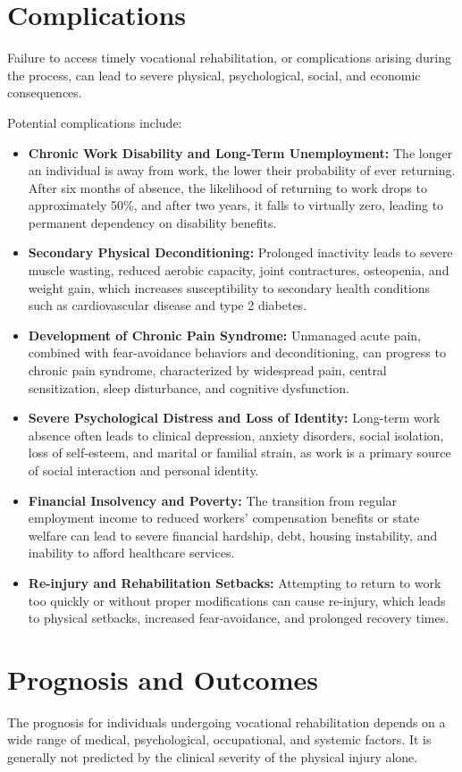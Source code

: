 \section*{Complications}
Failure to access timely vocational rehabilitation, or complications arising during the process, can lead to severe physical, psychological, social, and economic consequences.

Potential complications include:
\begin{itemize}
    \item \textbf{Chronic Work Disability and Long-Term Unemployment:} The longer an individual is away from work, the lower their probability of ever returning. After six months of absence, the likelihood of returning to work drops to approximately 50\%, and after two years, it falls to virtually zero, leading to permanent dependency on disability benefits.
    \item \textbf{Secondary Physical Deconditioning:} Prolonged inactivity leads to severe muscle wasting, reduced aerobic capacity, joint contractures, osteopenia, and weight gain, which increases susceptibility to secondary health conditions such as cardiovascular disease and type 2 diabetes.
    \item \textbf{Development of Chronic Pain Syndrome:} Unmanaged acute pain, combined with fear-avoidance behaviors and deconditioning, can progress to chronic pain syndrome, characterized by widespread pain, central sensitization, sleep disturbance, and cognitive dysfunction.
    \item \textbf{Severe Psychological Distress and Loss of Identity:} Long-term work absence often leads to clinical depression, anxiety disorders, social isolation, loss of self-esteem, and marital or familial strain, as work is a primary source of social interaction and personal identity.
    \item \textbf{Financial Insolvency and Poverty:} The transition from regular employment income to reduced workers' compensation benefits or state welfare can lead to severe financial hardship, debt, housing instability, and inability to afford healthcare services.
    \item \textbf{Re-injury and Rehabilitation Setbacks:} Attempting to return to work too quickly or without proper modifications can cause re-injury, which leads to physical setbacks, increased fear-avoidance, and prolonged recovery times.
\end{itemize}

\section*{Prognosis and Outcomes}
The prognosis for individuals undergoing vocational rehabilitation depends on a wide range of medical, psychological, occupational, and systemic factors. It is generally not predicted by the clinical severity of the physical injury alone.

